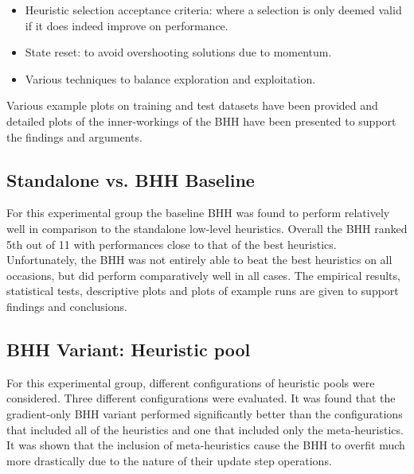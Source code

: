 \begin{itemize}
      \item {}Heuristic selection acceptance criteria: where a selection is only deemed valid if it does indeed improve on performance.

      \item State reset: to avoid overshooting solutions due to momentum.

      \item Various techniques to balance exploration and exploitation.
\end{itemize}

Various example plots on training and test datasets have been provided and detailed plots of the inner-workings of the \ac{BHH} have been presented to support the findings and arguments.

\subsection{Standalone vs. \ac{BHH} Baseline}
\label{sec:conclusion:results:summary:standalone}

For this experimental group the baseline \ac{BHH} was found to perform relatively well in comparison to the standalone low-level heuristics. Overall the \ac{BHH} ranked 5th out of 11 with performances close to that of the best heuristics. Unfortunately, the \ac{BHH} was not entirely able to beat the best heuristics on all occasions, but did perform comparatively well in all cases. The empirical results, statistical tests, descriptive plots and plots of example runs are given to support findings and conclusions.

\subsection{\ac{BHH} Variant: Heuristic pool}
\label{sec:conclusion:results:summary:heuristic_pool}

For this experimental group, different configurations of heuristic pools were considered. Three different configurations were evaluated. It was found that the gradient-only \ac{BHH} variant performed significantly better than the configurations that included all of the heuristics and one that included only the meta-heuristics. It was shown that the inclusion of meta-heuristics cause the \ac{BHH} to overfit much more drastically due to the nature of their update step operations.

